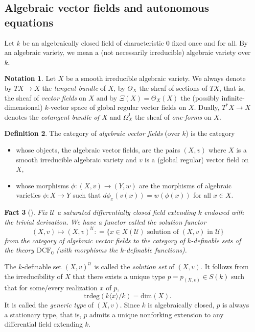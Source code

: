 \documentclass[12pt]{amsart}
\newcommand{\U}{\mathcal{U}}
\theoremstyle{definition}
\newtheorem{definition}{Definition}[subsection]
\newtheorem{notation}[definition]{Notation}
\theoremstyle{plain}
\newtheorem{fact}[definition]{Fact}
\theoremstyle{exampstyle}
\theoremstyle{exampstyle}\newtheorem{thmxbis}{Theorem}
\numberwithin{equation}{section}
\theoremstyle{remark}
\begin{document}
\subsection{Algebraic vector fields and autonomous equations} Let $k$ be an algebraically closed field of characteristic $0$ fixed once and for all. By an algebraic variety, we mean a (not necessarily irreducible) algebraic variety over $k$.

\begin{notation} 
Let $X$ be a smooth irreducible algebraic variety. We always denote by $TX \rightarrow X$ the {\em tangent bundle} of $X$, by $\Theta_X$ the sheaf of sections of $TX$, that is, the sheaf of {\em vector fields} on $X$ and by $\Xi(X) = \Theta_X(X)$ the (possibly infinite-dimensional) $k$-vector space of global regular vector fields on $X$.  Dually, $T^\ast X \rightarrow X$ denotes the {\em cotangent bundle of $X$} and $\Omega^1_X$ the sheaf of {\em one-forms} on $X$.   
\end{notation} 

\begin{definition} 
The category of {\em algebraic vector fields} (over $k$) is the category
\begin{itemize} 
\item whose objects, the algebraic vector fields, are the pairs $(X,v)$ where $X$ is a smooth irreducible algebraic variety and $v$ is a (global regular) vector field on $X$,
\item whose morphisms $\phi: (X,v) \rightarrow (Y,w)$ are the morphisms of algebraic varieties $\phi: X \rightarrow Y$ such that $d\phi_x(v(x)) = w(\phi(x))$ for all $x \in X$.
\end{itemize} 
\end{definition} 

\begin{fact}[{\citep[Section 1]{Hrushovski-Itai}}]\label{fact-solutionfunctor}
Fix  $ \mathcal U$ a saturated differentially closed field extending $k$ endowed with the trivial derivation. We have a functor called the {\em solution functor} 
$$(X,v) \mapsto (X,v)^\U : = \lbrace x \in X(\U) \text{ solution of } (X,v) \text{ in } \U \rbrace$$  
from the category of algebraic vector fields to the category of $k$-definable sets of the theory $\mathrm{DCF}_0$ (with morphisms the $k$-definable functions).
\end{fact} 
The $k$-definable set $(X,v)^\U$ is called the {\em solution set} of $(X,v)$. It follows from the irreducibility of $X$ that there exists a unique  type $p = p_{(X,v)} \in S(k)$ such that for some/every realization $x$ of $p$, 
\begin{equation}
\mathrm{trdeg}(k\langle x \rangle / k) = \mathrm{dim}(X).
\end{equation}
It is called the {\em{generic type}} of $(X,v)$. Since $k$ is algebraically closed, $p$ is always a stationary type, that is, $p$ admits a unique nonforking extension to any differential field extending $k$.
\end{document}
